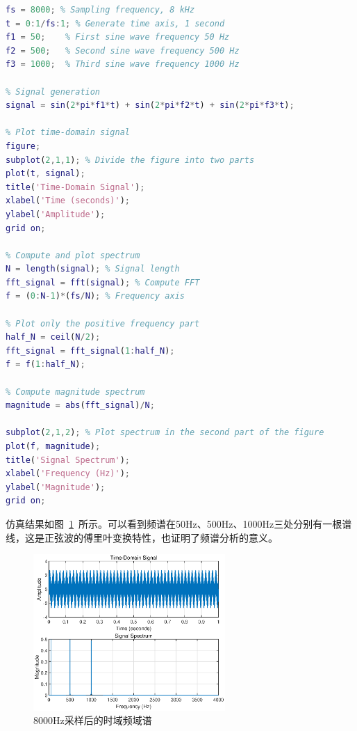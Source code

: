 \begin{example}
  \begin{lstlisting}[language=matlab]
fs = 8000; % Sampling frequency, 8 kHz
t = 0:1/fs:1; % Generate time axis, 1 second
f1 = 50;    % First sine wave frequency 50 Hz
f2 = 500;   % Second sine wave frequency 500 Hz
f3 = 1000;  % Third sine wave frequency 1000 Hz

% Signal generation
signal = sin(2*pi*f1*t) + sin(2*pi*f2*t) + sin(2*pi*f3*t);

% Plot time-domain signal
figure;
subplot(2,1,1); % Divide the figure into two parts
plot(t, signal);
title('Time-Domain Signal');
xlabel('Time (seconds)');
ylabel('Amplitude');
grid on;

% Compute and plot spectrum
N = length(signal); % Signal length
fft_signal = fft(signal); % Compute FFT
f = (0:N-1)*(fs/N); % Frequency axis

% Plot only the positive frequency part
half_N = ceil(N/2);
fft_signal = fft_signal(1:half_N);
f = f(1:half_N);

% Compute magnitude spectrum
magnitude = abs(fft_signal)/N;

subplot(2,1,2); % Plot spectrum in the second part of the figure
plot(f, magnitude);
title('Signal Spectrum');
xlabel('Frequency (Hz)');
ylabel('Magnitude');
grid on;

  \end{lstlisting}
\end{example}
仿真结果如图~\ref{fig:fig1}~所示。可以看到频谱在50Hz、500Hz、1000Hz三处分别有一根谱线，这是正弦波的傅里叶变换特性，也证明了频谱分析的意义。
\begin{figure}[htbp]
  \centering
  \includegraphics[width=0.65\textwidth]{figure/exp1/fig1.eps}
  \caption{8000Hz采样后的时域频域谱}
  \label{fig:fig1}
\end{figure}
